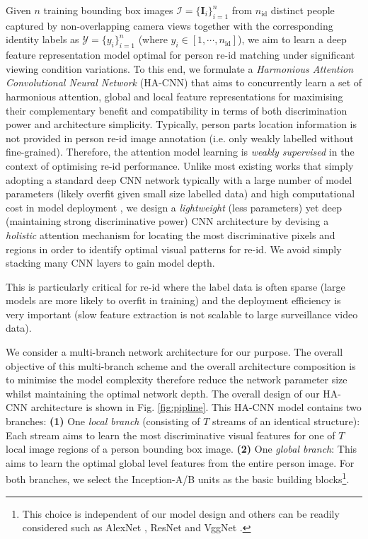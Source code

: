 \documentclass[10pt,twocolumn,letterpaper]{article}
\begin{document}
Given $n$ training bounding box images $\mathcal{I} = \{ \bm{I}_i \}_{i=1}^n$  
from $n_\text{id}$ distinct people captured by non-overlapping camera views together with the corresponding identity labels as $\mathcal{Y} = \{y_i\}_{i=1}^n$
(where $y_i \in [1,\cdots, n_\text{id}]$), 
we aim to learn a deep feature representation model optimal for person re-id matching under significant viewing condition variations. To this end, we formulate a {\em Harmonious Attention Convolutional Neural Network} (HA-CNN) 
that aims to concurrently learn a set of harmonious attention, global and local feature representations for maximising their complementary benefit and compatibility 
in terms of both discrimination power and architecture simplicity.
Typically, person parts location information is not provided in person
re-id image annotation (i.e. only weakly labelled without fine-grained).
Therefore, the attention model learning is {\em weakly supervised}
in the context of optimising re-id performance.
Unlike most existing works that simply adopting a standard deep CNN
network typically with a large number of model parameters (likely
overfit given small size labelled data) and high
computational cost in model deployment
\cite{krizhevsky2012imagenet,simonyan2014very,szegedy2015going,he2016deep}, 
we design a {\em lightweight} (less parameters) yet deep (maintaining strong
discriminative power) CNN architecture by
devising a {\em holistic} attention mechanism for
locating the most discriminative pixels and regions in order to identify
optimal visual patterns for re-id. We avoid simply
stacking many CNN layers to gain model depth. 

This is particularly critical for re-id
where the label data is often sparse 
(large models are more likely to overfit in training) 
and the deployment efficiency is very important 
(slow feature extraction is not scalable to large surveillance video data).



\vspace{0.1cm}
We consider a multi-branch network architecture for our purpose. The
overall objective of this multi-branch scheme and the overall
architecture composition is to minimise the model complexity therefore
reduce the network parameter size whilst maintaining the optimal
network depth. The overall design of our HA-CNN architecture is shown
in Fig. \ref{fig:pipline}.
This HA-CNN model contains two branches:
{\bf (1)} One {\em local branch} (consisting of $T$ streams of an identical structure):
Each stream aims to learn the most discriminative visual
features for one of $T$ local image regions of a person bounding box image.
{\bf (2)} One {\em global branch}:
This aims to learn the optimal global level features from the entire person image.
For both branches, we select the Inception-A/B units \cite{xiao2016learning,szegedy2017inception} 
as the basic building blocks\footnote{This choice is independent of our model design
and others can be readily considered such as
AlexNet \cite{krizhevsky2012imagenet},
ResNet \cite{he2016deep} and VggNet \cite{simonyan2014very}.}.
\end{document}
